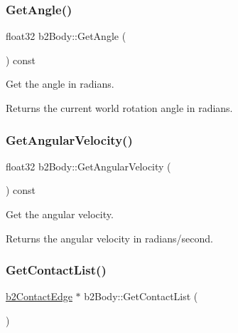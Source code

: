 \subsubsection{\texorpdfstring{Get\+Angle()}{GetAngle()}}
{\footnotesize\ttfamily float32 b2\+Body\+::\+Get\+Angle (\begin{DoxyParamCaption}{ }\end{DoxyParamCaption}) const\hspace{0.3cm}{\ttfamily [inline]}}

Get the angle in radians. \begin{DoxyReturn}{Returns}
the current world rotation angle in radians. 
\end{DoxyReturn}
\mbox{\label{classb2Body_a6a404d85efc510f43575f61cb95c07a7}} 
\subsubsection{\texorpdfstring{Get\+Angular\+Velocity()}{GetAngularVelocity()}}
{\footnotesize\ttfamily float32 b2\+Body\+::\+Get\+Angular\+Velocity (\begin{DoxyParamCaption}{ }\end{DoxyParamCaption}) const\hspace{0.3cm}{\ttfamily [inline]}}

Get the angular velocity. \begin{DoxyReturn}{Returns}
the angular velocity in radians/second. 
\end{DoxyReturn}
\mbox{\label{classb2Body_a16bdbfb266c82a0ef51be351a8928bc5}} 
\subsubsection{\texorpdfstring{Get\+Contact\+List()}{GetContactList()}}
{\footnotesize\ttfamily \mbox{\hyperlink{structb2ContactEdge}{b2\+Contact\+Edge}} $\ast$ b2\+Body\+::\+Get\+Contact\+List (\begin{DoxyParamCaption}{ }\end{DoxyParamCaption})\hspace{0.3cm}{\ttfamily [inline]}}

